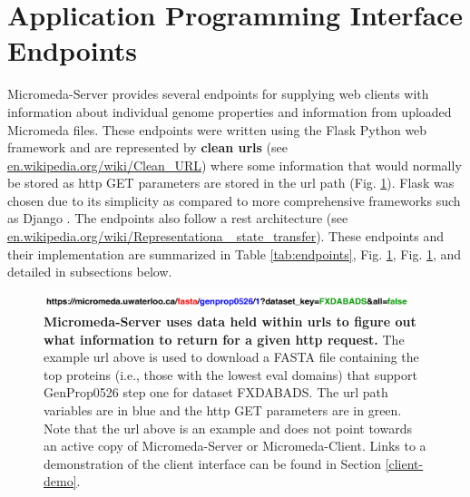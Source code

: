 \section{Application Programming Interface Endpoints} \label{endpoints}

Micromeda-Server provides several endpoints for supplying web clients with information about individual genome properties and information from uploaded Micromeda files. These endpoints were written using the Flask Python web framework \cite{grinberg2018flask} and are represented by \textbf{clean \gls{url}s} (see \href{http://en.wikipedia.org/wiki/Clean_URL}{en.wikipedia.org/wiki/Clean\_URL}) where some information that would normally be stored as \gls{http} GET parameters are stored in the \gls{url} path (Fig. \ref{fig:endpoint-url}). Flask was chosen due to its simplicity as compared to more comprehensive frameworks such as Django \cite{holovaty2009definitive}. The endpoints also follow a \gls{rest} architecture \cite{fielding2000representational} (see \href{http://en.wikipedia.org/wiki/Representational_state_transfer}{en.wikipedia.org/wiki/Representationa \_state\_transfer}). These endpoints and their implementation are summarized in Table \ref{tab:endpoints}, Fig. \ref{endpoints}, Fig. \ref{fig:endpoint-url}, and detailed in subsections below.

\begin{figure}[!ht]
  \centering
	\includegraphics[width=0.95\textwidth]{media/Coloured-Endpoint.pdf}
	 \caption[Micromeda-Server uses data held within URLs to figure out what information to return for a given HTTP request.]{\textbf{Micromeda-Server uses data held within \gls{url}s to figure out what information to return for a given \gls{http} request.} The example \gls{url} above is used to download a FASTA file containing the top proteins (i.e., those with the lowest \gls{eval} domains) that support GenProp0526 step one for dataset FXDABADS. The \gls{url} path variables are in blue and the \gls{http} GET parameters are in green. Note that the \gls{url} above is an example and does not point towards an active copy of Micromeda-Server or Micromeda-Client. Links to a demonstration of the client interface can be found in Section \ref{client-demo}.}
	 \label{fig:endpoint-url}
\end{figure}

